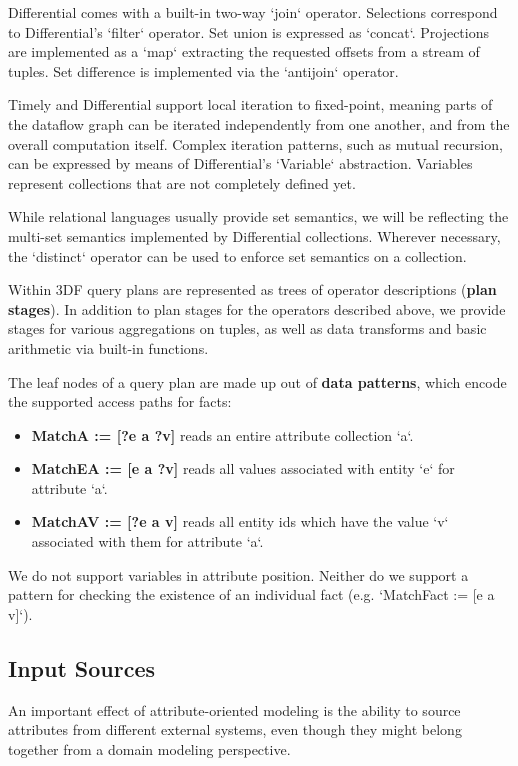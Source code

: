 \documentclass[../index.tex]{subfiles}
\begin{document}
Differential comes with a built-in two-way `join` operator. Selections
correspond to Differential's `filter` operator. Set union is expressed
as `concat`. Projections are implemented as a `map` extracting the
requested offsets from a stream of tuples. Set difference is
implemented via the `antijoin` operator.

Timely and Differential support local iteration to fixed-point,
meaning parts of the dataflow graph can be iterated independently from
one another, and from the overall computation itself. Complex
iteration patterns, such as mutual recursion, can be expressed by
means of Differential's `Variable` abstraction. Variables represent
collections that are not completely defined yet.

While relational languages usually provide set semantics, we will be
reflecting the multi-set semantics implemented by Differential
collections. Wherever necessary, the `distinct` operator can be used
to enforce set semantics on a collection.

Within 3DF query plans are represented as trees of operator
descriptions (\textbf{plan stages}). In addition to plan stages for the
operators described above, we provide stages for various aggregations
on tuples, as well as data transforms and basic arithmetic via
built-in functions.

The leaf nodes of a query plan are made up out of \textbf{data patterns},
which encode the supported access paths for facts:

\begin{itemize}
\item \textbf{MatchA := [?e a ?v]} reads an entire attribute collection `a`.
\item \textbf{MatchEA := [e a ?v]} reads all values associated with entity `e`
for attribute `a`.
\item \textbf{MatchAV := [?e a v]} reads all entity ids which have the value `v`
associated with them for attribute `a`.
\end{itemize}

We do not support variables in attribute position. Neither do we
support a pattern for checking the existence of an individual fact
(e.g. `MatchFact := [e a v]`).

\subsection{Input Sources}

An important effect of attribute-oriented modeling is the ability to
source attributes from different external systems, even though they
might belong together from a domain modeling perspective.
\end{document}

